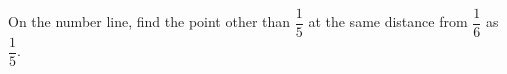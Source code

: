 On the number line, find the point other than $\dfrac{1}{5}$ at the same distance from $\dfrac{1}{6}$ as $\dfrac{1}{5}$.
